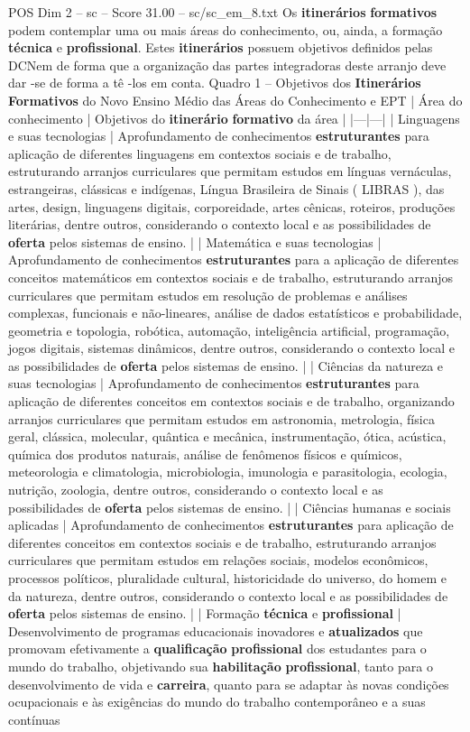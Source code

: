 \begin{textsample}{POS Dim 2 – sc – Score 31.00 – sc/sc\_em\_8.txt}
Os \textbf{itinerários} \textbf{formativos} podem contemplar uma ou mais áreas do conhecimento, ou, ainda, a formação \textbf{técnica} e \textbf{profissional}.
Estes \textbf{itinerários} possuem objetivos definidos pelas DCNem de forma que a organização das partes integradoras deste arranjo deve dar -se de forma a tê -los em conta.
Quadro 1 – Objetivos dos \textbf{Itinerários} \textbf{Formativos} do Novo Ensino Médio das Áreas do Conhecimento e EPT | Área do conhecimento | Objetivos do \textbf{itinerário} \textbf{formativo} da área | |---|---| | Linguagens e suas tecnologias | Aprofundamento de conhecimentos \textbf{estruturantes} para aplicação de diferentes linguagens em contextos sociais e de trabalho, estruturando arranjos curriculares que permitam estudos em línguas vernáculas, estrangeiras, clássicas e indígenas, Língua Brasileira de Sinais ( LIBRAS ), das artes, design, linguagens digitais, corporeidade, artes cênicas, roteiros, produções literárias, dentre outros, considerando o contexto local e as possibilidades de \textbf{oferta} pelos sistemas de ensino. | | Matemática e suas tecnologias | Aprofundamento de conhecimentos \textbf{estruturantes} para a aplicação de diferentes conceitos matemáticos em contextos sociais e de trabalho, estruturando arranjos curriculares que permitam estudos em resolução de problemas e análises complexas, funcionais e não-lineares, análise de dados estatísticos e probabilidade, geometria e topologia, robótica, automação, inteligência artificial, programação, jogos digitais, sistemas dinâmicos, dentre outros, considerando o contexto local e as possibilidades de \textbf{oferta} pelos sistemas de ensino. | | Ciências da natureza e suas tecnologias | Aprofundamento de conhecimentos \textbf{estruturantes} para aplicação de diferentes conceitos em contextos sociais e de trabalho, organizando arranjos curriculares que permitam estudos em astronomia, metrologia, física geral, clássica, molecular, quântica e mecânica, instrumentação, ótica, acústica, química dos produtos naturais, análise de fenômenos físicos e químicos, meteorologia e climatologia, microbiologia, imunologia e parasitologia, ecologia, nutrição, zoologia, dentre outros, considerando o contexto local e as possibilidades de \textbf{oferta} pelos sistemas de ensino. | | Ciências humanas e sociais aplicadas | Aprofundamento de conhecimentos \textbf{estruturantes} para aplicação de diferentes conceitos em contextos sociais e de trabalho, estruturando arranjos curriculares que permitam estudos em relações sociais, modelos econômicos, processos políticos, pluralidade cultural, historicidade do universo, do homem e da natureza, dentre outros, considerando o contexto local e as possibilidades de \textbf{oferta} pelos sistemas de ensino. | | Formação \textbf{técnica} e \textbf{profissional} | Desenvolvimento de programas educacionais inovadores e \textbf{atualizados} que promovam efetivamente a \textbf{qualificação} \textbf{profissional} dos estudantes para o mundo do trabalho, objetivando sua \textbf{habilitação} \textbf{profissional}, tanto para o desenvolvimento de vida e \textbf{carreira}, quanto para se adaptar às novas condições ocupacionais e às exigências do mundo do trabalho contemporâneo e a suas contínuas 
\end{textsample}
